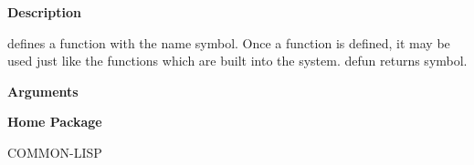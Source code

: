  
{\bf Description}

defines a function with the name symbol. Once a function is defined, it may be used just like the functions which are built into the system. defun returns symbol.

 
{\bf Arguments}


 
{\bf Home Package}

COMMON-LISP

